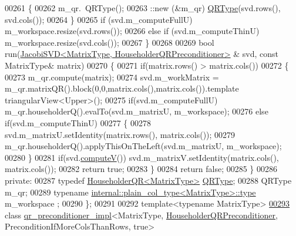 \begin{DoxyCode}
00261     \{
00262       m\_qr.~QRType();
00263       ::new (&m\_qr) \hyperlink{group___q_r___module}{QRType}(svd.rows(), svd.cols());
00264     \}
00265     \textcolor{keywordflow}{if} (svd.m\_computeFullU) m\_workspace.resize(svd.rows());
00266     \textcolor{keywordflow}{else} \textcolor{keywordflow}{if} (svd.m\_computeThinU) m\_workspace.resize(svd.cols());
00267   \}
00268 
00269   \textcolor{keywordtype}{bool} run(\hyperlink{group___s_v_d___module_class_eigen_1_1_jacobi_s_v_d}{JacobiSVD<MatrixType, HouseholderQRPreconditioner>}
      & svd, \textcolor{keyword}{const} MatrixType& matrix)
00270   \{
00271     \textcolor{keywordflow}{if}(matrix.rows() > matrix.cols())
00272     \{
00273       m\_qr.compute(matrix);
00274       svd.m\_workMatrix = m\_qr.matrixQR().block(0,0,matrix.cols(),matrix.cols()).\textcolor{keyword}{template} 
      triangularView<Upper>();
00275       \textcolor{keywordflow}{if}(svd.m\_computeFullU) m\_qr.householderQ().evalTo(svd.m\_matrixU, m\_workspace);
00276       \textcolor{keywordflow}{else} \textcolor{keywordflow}{if}(svd.m\_computeThinU)
00277       \{
00278         svd.m\_matrixU.setIdentity(matrix.rows(), matrix.cols());
00279         m\_qr.householderQ().applyThisOnTheLeft(svd.m\_matrixU, m\_workspace);
00280       \}
00281       \textcolor{keywordflow}{if}(svd.\hyperlink{group___s_v_d___module_a5f12efcb791eb007d4a4890ac5255ac4}{computeV}()) svd.m\_matrixV.setIdentity(matrix.cols(), matrix.cols());
00282       \textcolor{keywordflow}{return} \textcolor{keyword}{true};
00283     \}
00284     \textcolor{keywordflow}{return} \textcolor{keyword}{false};
00285   \}
00286 \textcolor{keyword}{private}:
00287   \textcolor{keyword}{typedef} \hyperlink{group___q_r___module}{HouseholderQR<MatrixType>} \hyperlink{group___q_r___module}{QRType};
00288   QRType m\_qr;
00289   \textcolor{keyword}{typename} \hyperlink{class_eigen_1_1internal_1_1_tensor_lazy_evaluator_writable}{internal::plain\_col\_type<MatrixType>::type} m\_workspace
      ;
00290 \};
00291 
00292 \textcolor{keyword}{template}<\textcolor{keyword}{typename} MatrixType>
\hyperlink{class_eigen_1_1internal_1_1qr__preconditioner__impl_3_01_matrix_type_00_01_householder_q_r_preco31667955395337fca0dd5f85cded2a6b}{00293} \textcolor{keyword}{class }\hyperlink{struct_eigen_1_1internal_1_1qr__preconditioner__impl}{qr\_preconditioner\_impl}<MatrixType, 
      \hyperlink{group__enums_gga46eba0d5c621f590b8cf1b53af31d56ea25d36655046e5910c850f62f84f34e25}{HouseholderQRPreconditioner}, PreconditionIfMoreColsThanRows, true>

\end{DoxyCode}
